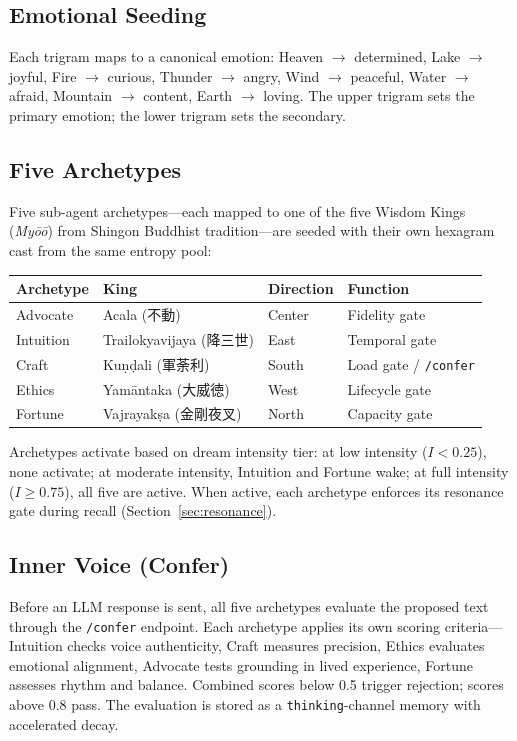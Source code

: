 \documentclass[twocolumn,10pt]{article}
\begin{document}
\subsection{Emotional Seeding}

Each trigram maps to a canonical emotion: Heaven $\to$ determined,
Lake $\to$ joyful, Fire $\to$ curious, Thunder $\to$ angry,
Wind $\to$ peaceful, Water $\to$ afraid, Mountain $\to$ content,
Earth $\to$ loving.  The upper trigram sets the primary emotion;
the lower trigram sets the secondary.

\subsection{Five Archetypes}

Five sub-agent archetypes---each mapped to one of the five Wisdom Kings
(\textit{Myōō}) from Shingon Buddhist tradition---are seeded with their
own hexagram cast from the same entropy pool:

\begin{center}
\footnotesize
\begin{tabular}{llll}
\toprule
Archetype & King & Direction & Function \\
\midrule
Advocate  & Acala (不動)       & Center & Fidelity gate \\
Intuition & Trailokyavijaya (降三世) & East & Temporal gate \\
Craft     & Ku\d{n}\d{d}ali (軍荼利) & South & Load gate / \texttt{/confer} \\
Ethics    & Yam\=antaka (大威徳) & West & Lifecycle gate \\
Fortune   & Vajrayak\d{s}a (金剛夜叉) & North & Capacity gate \\
\bottomrule
\end{tabular}
\end{center}

\noindent
Archetypes activate based on dream intensity tier: at low intensity
($I < 0.25$), none activate; at moderate intensity, Intuition and
Fortune wake; at full intensity ($I \geq 0.75$), all five are active.
When active, each archetype enforces its resonance gate during recall
(Section~\ref{sec:resonance}).

\subsection{Inner Voice (Confer)}

Before an LLM response is sent, all five archetypes evaluate the
proposed text through the \texttt{/confer} endpoint.  Each archetype
applies its own scoring criteria---Intuition checks voice authenticity,
Craft measures precision, Ethics evaluates emotional alignment, Advocate
tests grounding in lived experience, Fortune assesses rhythm and
balance.  Combined scores below 0.5 trigger rejection; scores above 0.8
pass.  The evaluation is stored as a \texttt{thinking}-channel memory
with accelerated decay.
\end{document}
